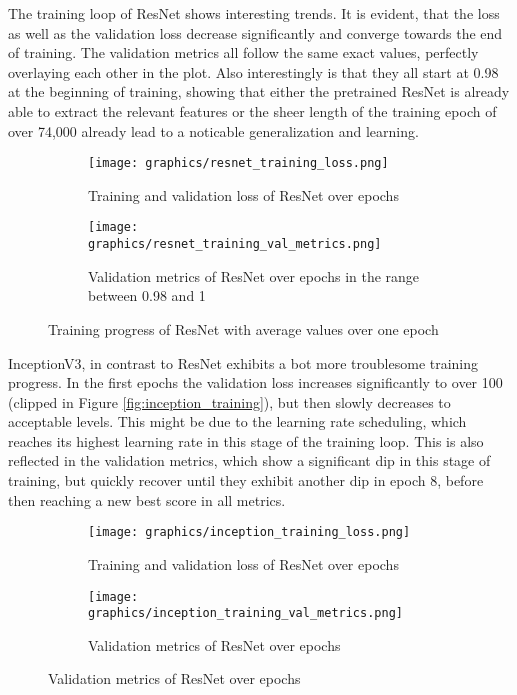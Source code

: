 \documentclass[draft,final]{vutinfth} %
\begin{document}
\begin{appendix}
The training loop of ResNet shows interesting trends. It is evident, that the loss as well as the validation loss decrease significantly and converge towards the end of training. The validation metrics all follow the same exact values, perfectly overlaying each other in the plot. Also interestingly is that they all start at 0.98 at the beginning of training, showing that either the pretrained ResNet is already able to extract the relevant features or the sheer length of the training epoch of over 74,000 already lead to a noticable generalization and learning.

\begin{figure}
    \centering
    \begin{subfigure}{0.48\textwidth}
        \texttt{[image: graphics/resnet\_training\_loss.png]}
        \caption{Training and validation loss of ResNet over epochs}
        \label{fig:resnet_training_loss}
    \end{subfigure}
    \begin{subfigure}{0.48\textwidth}
        \centering
        \texttt{[image: graphics/resnet\_training\_val\_metrics.png]}
        \caption{Validation metrics of ResNet over epochs in the range between 0.98 and 1}
        \label{fig:resnet_training_val_metrics}
        
    \end{subfigure}
    \caption{Training progress of ResNet with average values over one epoch}
    \label{fig:resnet_training}
\end{figure}

InceptionV3, in contrast to ResNet exhibits a bot more troublesome training progress. In the first epochs the validation loss increases significantly to over 100 (clipped in Figure \ref{fig:inception_training}), but then slowly decreases to acceptable levels. This might be due to the learning rate scheduling, which reaches its highest learning rate in this stage of the training loop. This is also reflected in the validation metrics, which show a significant dip in this stage of training, but quickly recover until they exhibit another dip in epoch 8, before then reaching a new best score in all metrics.

\begin{figure}
    \centering
    \begin{subfigure}{0.48\textwidth}
        \texttt{[image: graphics/inception\_training\_loss.png]}
        \caption{Training and validation loss of ResNet over epochs}
        \label{fig:inception_training_loss}
    \end{subfigure}
    \begin{subfigure}{0.48\textwidth}
        \centering
        \texttt{[image: graphics/inception\_training\_val\_metrics.png]}
        \caption{Validation metrics of ResNet over epochs \newline}
        \label{fig:inception_training_val_metrics}
        

\end{subfigure}
\end{figure}
\end{appendix}
\end{document}
